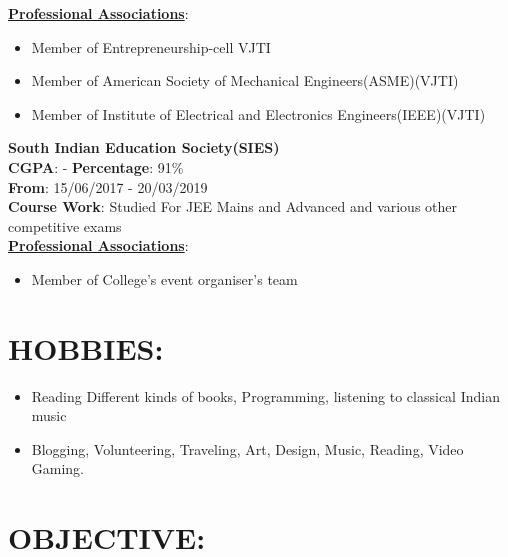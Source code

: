 \documentclass{article}
\begin{document}
\begin{multicols}{2}
{{\textbf{\underline{Professional Associations}}}:
\begin{itemize}[noitemsep,nolistsep]
	
	\item Member of Entrepreneurship-cell VJTI
	\item Member of American Society of Mechanical Engineers(ASME)(VJTI)
	\item Member of Institute of Electrical and Electronics Engineers(IEEE)(VJTI)
	
\end{itemize}
\vspace{3pt}
{\textbf{South Indian Education Society(SIES)}} \\
\textbf{CGPA}: -  \hspace{3cm}      \textbf{Percentage}: 91\% \\
\textbf{From}: 15/06/2017 - 20/03/2019 \\   
\textbf{Course Work}:
Studied For JEE Mains and Advanced and various other competitive exams \\
{\textbf{\underline{Professional Associations}}}:
\begin{itemize}[noitemsep,nolistsep]
	\item Member of College's event organiser's team
  
\end{itemize} 


}
\vspace{5pt}


\section*{\large{\uppercase{Hobbies:}}}

\begin{flushleft}
\begin{itemize}[noitemsep,nolistsep]
	\item Reading Different kinds of books, Programming, listening to classical Indian music
	\item Blogging, Volunteering, Traveling, Art, Design, Music, Reading, Video Gaming.
\end{itemize}
\end{flushleft}
\vspace{5pt}
\columnbreak

\section*{\large{\uppercase{objective:}}}


\end{multicols}
\end{document}
